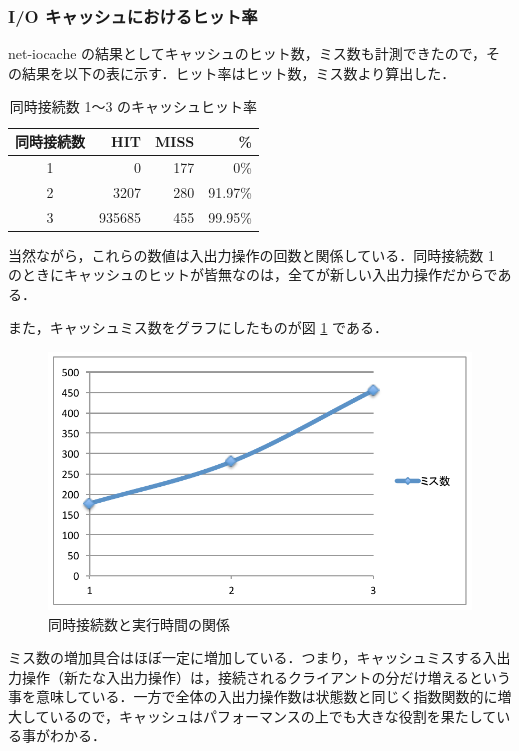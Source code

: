 \documentclass[a4j,12pt]{jarticle}
\begin{document}
\subsubsection{I/O キャッシュにおけるヒット率}

net-iocache の結果としてキャッシュのヒット数，ミス数も計測できたので，その結果を以下の表に示す．ヒット率はヒット数，ミス数より算出した．

\begin{table}[here]
\caption[同時接続数 1〜3 のキャッシュヒット率]{同時接続数 1〜3 のキャッシュヒット率}
\label{table:result-cache}
\begin{center}
\begin{tabular}{crrr}
\toprule
同時接続数 & HIT & MISS & \% \\
\midrule
1 & 0 & 177 & 0\% \\
2 & 3207 & 280 & 91.97\% \\
3 & 935685 & 455 & 99.95\% \\
\bottomrule
\end{tabular}
\end{center}
\end{table}

当然ながら，これらの数値は入出力操作の回数と関係している．同時接続数 1 のときにキャッシュのヒットが皆無なのは，全てが新しい入出力操作だからである．

また，キャッシュミス数をグラフにしたものが図 \ref{figure:graph3} である．

\newpage


\begin{figure}[here]
\centering
\includegraphics[width=12cm]{images/graph3.pdf}
\caption{同時接続数と実行時間の関係}
\label{figure:graph3}
\end{figure}

ミス数の増加具合はほぼ一定に増加している．つまり，キャッシュミスする入出力操作（新たな入出力操作）は，接続されるクライアントの分だけ増えるという事を意味している．一方で全体の入出力操作数は状態数と同じく指数関数的に増大しているので，キャッシュはパフォーマンスの上でも大きな役割を果たしている事がわかる．
\end{document}
